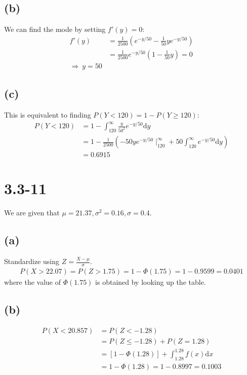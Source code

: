\documentclass[12pt]{article}
\theoremstyle{definition}
\theoremstyle{remark}
\begin{document}
\subsection*{(b)}
We can find the mode by setting $f'(y)=0$:
\begin{align*}
    f'(y)&=\frac{1}{2500}(e^{-y/50}-\frac{1}{50}ye^{-y/50}) \\
    &=\frac{1}{2500}e^{-y/50}(1-\frac{1}{50}y)=0 \\
    \Rightarrow\ y=50
\end{align*}
\subsection*{(c)}
This is equivalent to finding $P(Y<120)=1-P(Y\ge 120)$:
\begin{align*}
    P(Y<120)&=1-\int_{120}^{\infty}\frac{y}{50^2}e^{-y/50}\mathrm{d}y \\
    &=1-\frac{1}{2500}(-50ye^{-y/50}\mid^{\infty}_{120}+50\int_{120}^{\infty}e^{-y/50}\mathrm{d}y)\\
    &=0.6915
\end{align*}


\newpage{}
\section*{3.3-11}
We are given that $\mu=21.37,\sigma^2=0.16,\sigma=0.4$.
\subsection*{(a)}
Standardize using  $Z=\frac{X-\mu}{\sigma}$.
\begin{align*}
    P(X>22.07)=P(Z>1.75)=1-\Phi(1.75)=1-0.9599=0.0401
\end{align*}
where the value of $\Phi(1.75)$ is obtained by looking up the table.


\subsection*{(b)}
\begin{align*}
    P(X<20.857)&=P(Z<-1.28) \\
    &=P(Z\le -1.28)+P(Z=1.28) \\
    &=[1-\Phi(1.28)]+\int_{1.28}^{1.28}f(x)\mathrm{d}x \\
    &=1-\Phi(1.28)=1-0.8997=0.1003
\end{align*}
\end{document}
